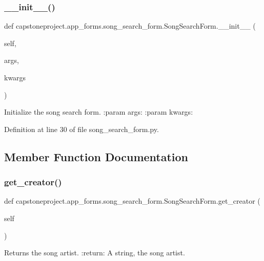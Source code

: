 \subsubsection{\texorpdfstring{\+\_\+\+\_\+init\+\_\+\+\_\+()}{\_\_init\_\_()}}
{\footnotesize\ttfamily def capstoneproject.\+app\+\_\+forms.\+song\+\_\+search\+\_\+form.\+Song\+Search\+Form.\+\_\+\+\_\+init\+\_\+\+\_\+ (\begin{DoxyParamCaption}\item[{}]{self,  }\item[{}]{args,  }\item[{}]{kwargs }\end{DoxyParamCaption})}

\begin{DoxyVerb}Initialize the song search form.
:param args:
:param kwargs:
\end{DoxyVerb}
 

Definition at line 30 of file song\+\_\+search\+\_\+form.\+py.



\subsection{Member Function Documentation}
\mbox{\label{classcapstoneproject_1_1app__forms_1_1song__search__form_1_1_song_search_form_aeffde805cce0affdd12c12781c9c2f27}} 
\subsubsection{\texorpdfstring{get\+\_\+creator()}{get\_creator()}}
{\footnotesize\ttfamily def capstoneproject.\+app\+\_\+forms.\+song\+\_\+search\+\_\+form.\+Song\+Search\+Form.\+get\+\_\+creator (\begin{DoxyParamCaption}\item[{}]{self }\end{DoxyParamCaption})}

\begin{DoxyVerb}Returns the song artist.
:return: A string, the song artist.
\end{DoxyVerb}
 

